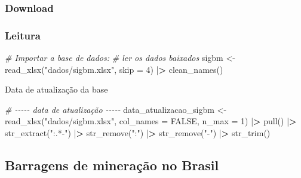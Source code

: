 \documentclass[
]{article}
\newenvironment{Shaded}{\begin{snugshade}}{\end{snugshade}}
\newcommand{\AttributeTok}[1]{\textcolor[rgb]{0.77,0.63,0.00}{#1}}
\newcommand{\CommentTok}[1]{\textcolor[rgb]{0.56,0.35,0.01}{\textit{#1}}}
\newcommand{\ConstantTok}[1]{\textcolor[rgb]{0.00,0.00,0.00}{#1}}
\newcommand{\DecValTok}[1]{\textcolor[rgb]{0.00,0.00,0.81}{#1}}
\newcommand{\ErrorTok}[1]{\textcolor[rgb]{0.64,0.00,0.00}{\textbf{#1}}}
\newcommand{\FunctionTok}[1]{\textcolor[rgb]{0.00,0.00,0.00}{#1}}
\newcommand{\NormalTok}[1]{#1}
\newcommand{\OtherTok}[1]{\textcolor[rgb]{0.56,0.35,0.01}{#1}}
\newcommand{\SpecialCharTok}[1]{\textcolor[rgb]{0.00,0.00,0.00}{#1}}
\newcommand{\StringTok}[1]{\textcolor[rgb]{0.31,0.60,0.02}{#1}}
\begin{document}
\hypertarget{download}{%
\subsubsection{Download}\label{download}}

\hypertarget{leitura}{%
\subsubsection{Leitura}\label{leitura}}

\begin{Shaded}
\begin{Highlighting}[]
\CommentTok{\# Importar a base de dados:}
\CommentTok{\# ler os dados baixados}
\NormalTok{sigbm }\OtherTok{\textless{}{-}} \FunctionTok{read\_xlsx}\NormalTok{(}\StringTok{"dados/sigbm.xlsx"}\NormalTok{, }\AttributeTok{skip =} \DecValTok{4}\NormalTok{) }\SpecialCharTok{|}\ErrorTok{\textgreater{}}
  \FunctionTok{clean\_names}\NormalTok{()}
\end{Highlighting}
\end{Shaded}

Data de atualização da base

\begin{Shaded}
\begin{Highlighting}[]
\CommentTok{\# {-}{-}{-}{-}{-} data de atualização {-}{-}{-}{-}{-}}
\NormalTok{data\_atualizacao\_sigbm }\OtherTok{\textless{}{-}} \FunctionTok{read\_xlsx}\NormalTok{(}\StringTok{"dados/sigbm.xlsx"}\NormalTok{,}
                                    \AttributeTok{col\_names =} \ConstantTok{FALSE}\NormalTok{,}
                                    \AttributeTok{n\_max =} \DecValTok{1}\NormalTok{) }\SpecialCharTok{|}\ErrorTok{\textgreater{}}
  \FunctionTok{pull}\NormalTok{() }\SpecialCharTok{|}\ErrorTok{\textgreater{}}
  \FunctionTok{str\_extract}\NormalTok{(}\StringTok{":.*{-}"}\NormalTok{) }\SpecialCharTok{|}\ErrorTok{\textgreater{}}
  \FunctionTok{str\_remove}\NormalTok{(}\StringTok{":"}\NormalTok{) }\SpecialCharTok{|}\ErrorTok{\textgreater{}}
  \FunctionTok{str\_remove}\NormalTok{(}\StringTok{"{-}"}\NormalTok{) }\SpecialCharTok{|}\ErrorTok{\textgreater{}}
  \FunctionTok{str\_trim}\NormalTok{()}
\end{Highlighting}
\end{Shaded}

\hypertarget{barragens-de-minerauxe7uxe3o-no-brasil}{%
\subsection{Barragens de mineração no
Brasil}\label{barragens-de-minerauxe7uxe3o-no-brasil}}
\end{document}
